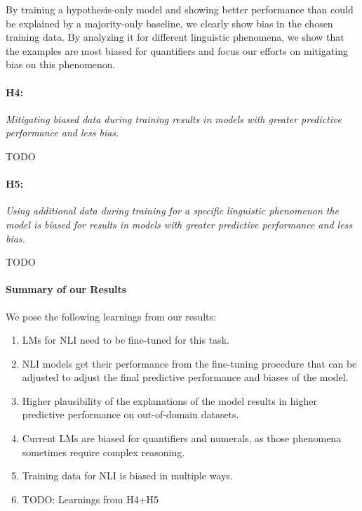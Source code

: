 By training a hypothesis-only model and showing better performance than could be explained by a majority-only baseline, we clearly show bias in the chosen training data. By analyzing it for different linguistic phenomena, we show that the examples are most biased for quantifiers and focus our efforts on mitigating bias on this phenomenon. 

\paragraph{H4:} \textit{Mitigating biased data during training results in models with greater predictive performance and less bias.}

TODO

\paragraph{H5:} \textit{Using additional data during training for a specific linguistic phenomenon the model is biased for results in models with greater predictive performance and less bias.}

TODO

\paragraph{Summary of our Results}

We pose the following learnings from our results:

\begin{enumerate}
    \item \acp{LM} for \ac{NLI} need to be fine-tuned for this task.
    \item \ac{NLI} models get their performance from the fine-tuning procedure that can be adjusted to adjust the final predictive performance and biases of the model.
    \item Higher plausibility of the explanations of the model results in higher predictive performance on out-of-domain datasets.
    \item Current \acp{LM} are biased for quantifiers and numerals, as those phenomena sometimes require complex reasoning.
    \item Training data for \ac{NLI} is biased in multiple ways.
    \item TODO: Learnings from H4+H5
\end{enumerate}
